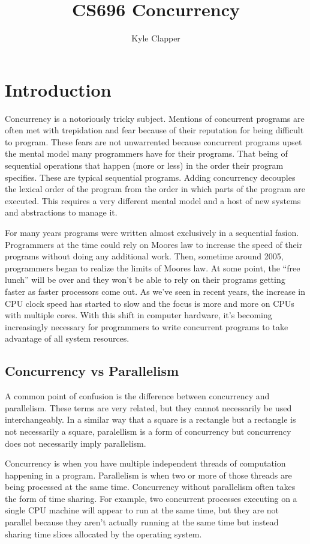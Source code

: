 \documentclass{article}
\title{CS696 Concurrency}
\author{Kyle Clapper}
\begin{document}
\maketitle

\section{Introduction}
Concurrency is a notoriously tricky subject. Mentions of concurrent programs are
often met with trepidation and fear because of their reputation for being
difficult to program. These fears are not unwarrented because concurrent
programs upset the mental model many programmers have for their programs. That
being of sequential operations that happen (more or less) in the order their
program specifies. These are typical sequential programs. Adding concurrency
decouples the lexical order of the program from the order in which parts of the
program are executed. This requires a very different mental model and a host of
new systems and abstractions to manage it.

For many years programs were written almost exclusively in a sequential fasion.
Programmers at the time could rely on Moores law to increase the speed of their
programs without doing any additional work. Then, sometime around 2005, programmers
began to realize the limits of Moores law. At some point, the ``free lunch'' will
be over and they won't be able to rely on their programs getting faster as faster processors
come out. As we've seen in recent years, the increase in CPU clock speed has started to slow
and the focus is more and more on CPUs with multiple cores. With this shift in computer
hardware, it's becoming increasingly necessary for programmers to write concurrent programs
to take advantage of all system resources.

\subsection{Concurrency vs Parallelism}
A common point of confusion is the difference between concurrency and parallelism.
These terms are very related, but they cannot necessarily be used interchangeably.
In a similar way that a square is a rectangle but a rectangle is not necessarily a
square, paralellism is a form of concurrency but concurrency does not necessarily
imply parallelism.

Concurrency is when you have multiple independent threads of computation happening
in a program. Parallelism is when two or more of those threads are being processed
at the same time. Concurrency without parallelism often takes the form of time sharing.
For example, two concurrent processes executing on a single CPU machine will appear
to run at the same time, but they are not parallel because they aren't actually running
at the same time but instead sharing time slices allocated by the operating system.
\end{document}
